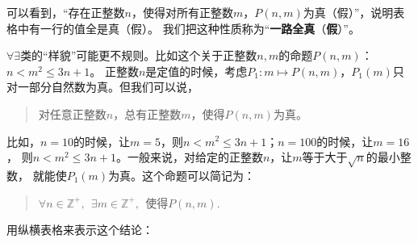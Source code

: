 \documentclass[12pt,UTF8,fontset=none]{ctexbook}
\begin{document}
可以看到，“存在正整数$n$，使得对所有正整数$m$，$P(n,m)$为真（假）”，说明表格中有一行的值全是真（假）。
我们把这种性质称为“\textbf{一路全真}（\textbf{假}）”。

$\forall\exists$类的“样貌”可能更不规则。比如这个关于正整数$n,m$的命题$P(n,m)$：$n < m^2 \leqslant 3n+1$。
正整数$n$是定值的时候，考虑$P_1 : m \mapsto P(n,m)$，$P_1(m)$只对一部分自然数为真。但我们可以说，
\begin{quotation}
    对任意正整数$n$，总有正整数$m$，使得$P(n,m)$为真。
\end{quotation}
比如，$n=10$的时候，让$m = 5$，则$n < m^2 \leqslant 3n+1$；$n=100$的时候，让$m = 16$，
则$n < m^2 \leqslant 3n+1$。一般来说，对给定的正整数$n$，让$m$等于大于$\sqrt{n}$的最小整数，
就能使$P_1(m)$为真。这个命题可以简记为：
\begin{quotation}
    $\forall n\in\mathbb{Z}^+, \;\, \exists m\in\mathbb{Z}^+, \;\,\mbox{使得} P(n,m).$
\end{quotation}
用纵横表格来表示这个结论：
\end{document}
